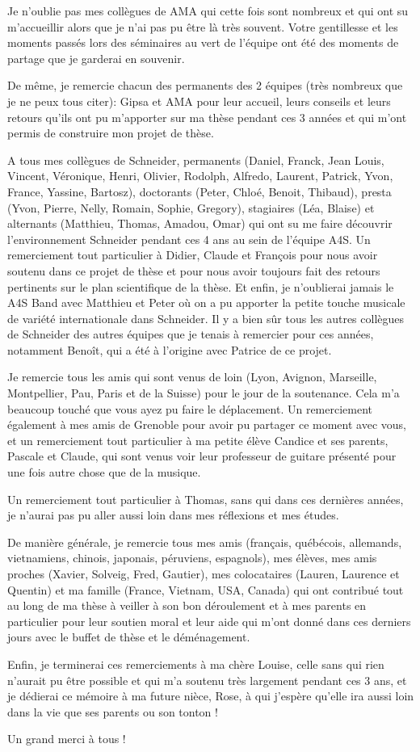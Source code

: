 Je n'oublie pas mes collègues de AMA qui cette fois sont nombreux et qui ont su m'accueillir alors que je n'ai pas pu être là très souvent. Votre gentillesse et les moments passés lors des séminaires au vert de l'équipe ont été des moments de partage que je garderai en souvenir.

De même, je remercie chacun des permanents des 2 équipes (très nombreux que je ne peux tous citer): Gipsa et AMA pour leur accueil, leurs conseils et leurs retours qu'ils ont pu m'apporter sur ma thèse pendant ces 3 années et qui m'ont permis de construire mon projet de thèse.

A tous mes collègues de Schneider, permanents (Daniel, Franck, Jean Louis, Vincent, Véronique, Henri, Olivier, Rodolph, Alfredo, Laurent, Patrick, Yvon, France, Yassine, Bartosz), doctorants (Peter, Chloé, Benoit, Thibaud), presta (Yvon, Pierre, Nelly, Romain, Sophie, Gregory), stagiaires (Léa, Blaise) et alternants (Matthieu, Thomas, Amadou, Omar) qui ont su me faire découvrir l'environnement Schneider pendant ces 4 ans au sein de l'équipe A4S. Un remerciement tout particulier à Didier, Claude et François pour nous avoir soutenu dans ce projet de thèse et pour nous avoir toujours fait des retours pertinents sur le plan scientifique de la thèse. Et enfin, je n'oublierai jamais le A4S Band avec Matthieu et Peter où on a pu apporter la petite touche musicale de variété internationale dans Schneider. Il y a bien sûr tous les autres collègues de Schneider des autres équipes que je tenais à remercier pour ces années, notamment Benoît, qui a été à l'origine avec Patrice de ce projet.

Je remercie tous les amis qui sont venus de loin (Lyon, Avignon, Marseille, Montpellier, Pau, Paris et de la Suisse) pour le jour de la soutenance. Cela m'a beaucoup touché que vous ayez pu faire le déplacement. Un remerciement également à mes amis de Grenoble pour avoir pu partager ce moment avec vous, et un remerciement tout particulier à ma petite élève Candice et ses parents, Pascale et Claude, qui sont venus voir leur professeur de guitare présenté pour une fois autre chose que de la musique.

Un remerciement tout particulier à Thomas, sans qui dans ces dernières années, je n'aurai pas pu aller aussi loin dans mes réflexions et mes études.

De manière générale, je remercie tous mes amis (français, québécois, allemands, vietnamiens, chinois, japonais, péruviens, espagnols), mes élèves, mes amis proches (Xavier, Solveig, Fred, Gautier), mes colocataires (Lauren, Laurence et Quentin) et ma famille (France, Vietnam, USA, Canada) qui ont contribué tout au long de ma thèse à veiller à son bon déroulement et à mes parents en particulier pour leur soutien moral et leur aide qui m'ont donné dans ces derniers jours avec le buffet de thèse et le déménagement.

Enfin, je terminerai ces remerciements à ma chère Louise, celle sans qui rien n'aurait pu être possible et qui m'a soutenu très largement pendant ces 3 ans, et je dédierai ce mémoire à ma future nièce, Rose, à qui j'espère qu'elle ira aussi loin dans la vie que ses parents ou son tonton !

Un grand merci à tous !